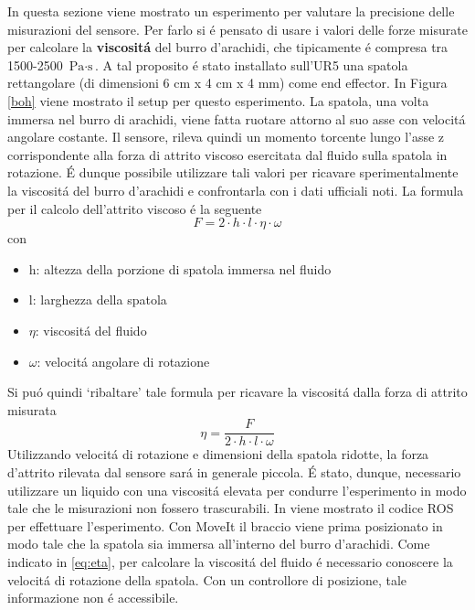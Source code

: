 In questa sezione viene mostrato un esperimento per valutare la precisione delle misurazioni del sensore. 
Per farlo si \'{e} pensato di usare i valori delle forze misurate per calcolare la \textbf{viscosit\'{a}} del burro d'arachidi, 
che tipicamente \'{e} compresa tra 1500-2500 $\text{Pa} \cdot \text{s}$. 
A tal proposito \'{e} stato installato sull'UR5 una spatola rettangolare (di dimensioni 6 cm x 4 cm x 4 mm) come end effector. 
In Figura \ref{boh} viene mostrato il setup per questo esperimento. 
La spatola, una volta immersa nel burro di arachidi, viene fatta ruotare attorno al suo asse con velocit\'{a} angolare 
costante. Il sensore, rileva quindi un momento torcente lungo l'asse z corrispondente alla forza di attrito viscoso esercitata 
dal fluido sulla spatola in rotazione. \'{E} dunque possibile utilizzare tali valori per ricavare sperimentalmente 
la viscosit\'{a} del burro d'arachidi e confrontarla con i dati ufficiali noti. 
La formula per il calcolo dell'attrito viscoso \'{e} la seguente 
\begin{equation*}
    F = 2 \cdot h \cdot l \cdot \eta \cdot \omega
\end{equation*}
con 
\begin{itemize}
    \item h: altezza della porzione di spatola immersa nel fluido
    \item l: larghezza della spatola
    \item $\eta$: viscosit\'{a} del fluido
    \item $\omega$: velocit\'{a} angolare di rotazione
\end{itemize}
Si pu\'{o} quindi `ribaltare' tale formula per ricavare la viscosit\'{a} dalla forza di attrito misurata 
\begin{equation} \label{eq:eta}
    \eta = \frac{F}{2 \cdot h \cdot l \cdot \omega}
\end{equation}
Utilizzando velocit\'{a} di rotazione e dimensioni della spatola ridotte, la forza d'attrito rilevata dal sensore sar\'{a} in generale piccola. 
\'{E} stato, dunque, necessario utilizzare un liquido con una viscosit\'{a} elevata per condurre l'esperimento in modo tale 
che le misurazioni non fossero trascurabili.
In \cite{viscosity} viene mostrato il codice ROS per effettuare l'esperimento. 
Con MoveIt il braccio viene prima posizionato in modo tale che la spatola sia immersa all'interno del burro d'arachidi. 
Come indicato in \ref{eq:eta}, per calcolare la viscosit\'{a} del fluido \'{e} necessario conoscere 
la velocit\'{a} di rotazione della spatola. Con un controllore di posizione, tale informazione non \'{e} accessibile. 
